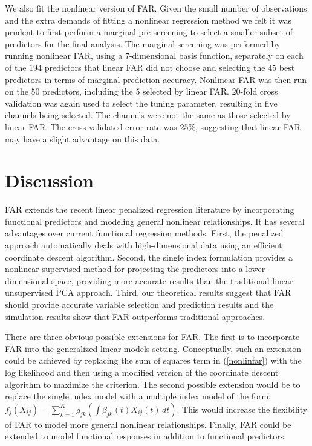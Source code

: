 \documentclass[aos,MSNbibl,dvips]{arximspdf}
\begin{document}
We also fit the nonlinear version of FAR. Given the small number of
observations and the extra demands of fitting a nonlinear regression
method we felt it was prudent
to first perform a marginal pre-screening to select a smaller subset of
predictors for the final analysis. The marginal screening was performed
by running nonlinear FAR,
using a $7$-dimensional basis function, separately on each of the $194$
predictors that linear FAR did not choose and selecting the $45$ best
predictors in terms of
marginal prediction accuracy. Nonlinear FAR was then run on the $50$
predictors, including the $5$ selected by linear FAR. $20$-fold cross
validation was again used to
select the tuning parameter, resulting in five channels being selected.
The channels were not the same as those selected by linear FAR. The
cross-validated error rate was
$25\%$, suggesting that linear FAR may have a slight advantage on this data.

\section{Discussion}
\label{discsec}

FAR extends the recent linear penalized regression literature by
incorporating functional predictors and modeling general nonlinear
relationships. It has several
advantages over current functional regression methods. First, the
penalized approach automatically deals with high-dimensional data using
an efficient coordinate descent
algorithm. Second, the single index formulation provides a nonlinear
supervised method for projecting the predictors into a
lower-dimensional space, providing more
accurate results than the traditional linear unsupervised PCA approach.
Third, our theoretical results suggest that FAR should provide accurate
variable selection and prediction results and the
simulation results show that FAR outperforms traditional approaches.

There are three obvious possible extensions for FAR. The first is to
incorporate FAR into the generalized linear models setting.
Conceptually, such an extension could be
achieved by replacing the sum of squares term in (\ref{nonlinfar})
with the log likelihood and then using a modified version of the
coordinate descent algorithm to
maximize the criterion. The second possible extension would be to
replace the single index model with a multiple index model of the form,
$f_j(X_{ij}) =
\sum_{k=1}^Kg_{jk} (\int\beta_{jk}(t)X_{ij}(t)\,dt )$. This
would increase the flexibility of FAR to model more general nonlinear
relationships. Finally, FAR could be extended to model functional
responses in addition to functional predictors.
\end{document}
